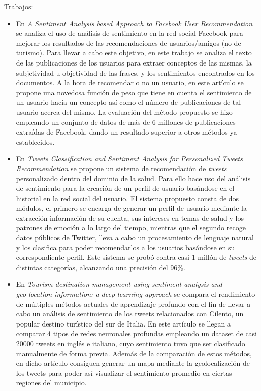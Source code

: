 Trabajos:
\begin{itemize}
    \item En \textit{A Sentiment Analysis based Approach to Facebook User Recommendation} se analiza el uso de análisis de sentimiento en la red social Facebook para mejorar los resultados de las recomendaciones de usuarios/amigos (no de turismo). Para llevar a cabo este objetivo, en este trabajo se analiza el texto de las publicaciones de los usuarios para extraer conceptos de las mismas, la subjetividad u objetividad de las frases, y los sentimientos encontrados en los documentos. A la hora de recomendar o no un usuario, en este artículo se propone una novedosa función de peso que tiene en cuenta el sentimiento de un usuario hacia un concepto así como el número de publicaciones de tal usuario acerca del mismo. La evaluación del método propuesto se hizo empleando un conjunto de datos de más de 6 millones de publicaciones extraídas de Facebook, dando un resultado superior a otros métodos ya establecidos.

    \item En \textit{Tweets Classification and Sentiment Analysis for Personalized
Tweets Recommendation} se propone un sistema de recomendación de \textit{tweets} personalizado dentro del dominio de la salud. Para ello hace uso del análisis de sentimiento para la creación de un perfil de usuario basándose en el historial en la red social del usuario. El sistema propuesto consta de dos módulos, el primero se encarga de generar un perfil de usuario mediante la extracción información de su cuenta, sus intereses en temas de salud y los patrones de emoción a lo largo del tiempo, mientras que el segundo recoge datos públicos de Twitter, lleva a cabo un procesamiento de lenguaje natural y los clasifica para poder recomendarlos a los usuarios basándose en su correspondiente perfil. Este sistema se probó contra casi 1 millón de \textit{tweets} de distintas categorías, alcanzando una precisión del 96\%.

    \item En \textit{Tourism destination management using sentiment analysis
and geo‑location information: a deep learning approach} se compara el rendimiento de múltiples métodos actuales de aprendizaje profundo con el fin de llevar a cabo un análisis de sentimiento de los tweets relacionados con Cilento, un popular destino turístico del sur de Italia. En este artículo se llegan a comparar 4 tipos de redes neuronales profundas empleando un dataset de casi 20000 tweets en inglés e italiano, cuyo sentimiento tuvo que ser clasificado manualmente de forma previa. Además de la comparación de estos métodos, en dicho artículo consiguen generar un mapa mediante la geolocalización de los tweets para poder así visualizar el sentimiento promedio en ciertas regiones del municipio.


\end{itemize}
